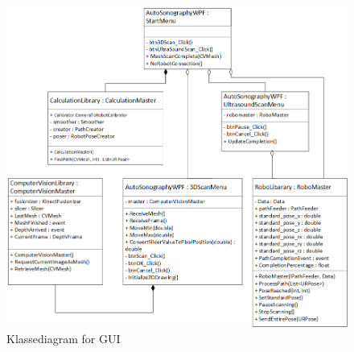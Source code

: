 \begin{figure}[H]
    \centering
    \includegraphics[width=1\textwidth]{figurer/d/Design/Class/uml_class_gui}
    \caption{Klassediagram for GUI}
    \label{class_gui}
\end{figure}

